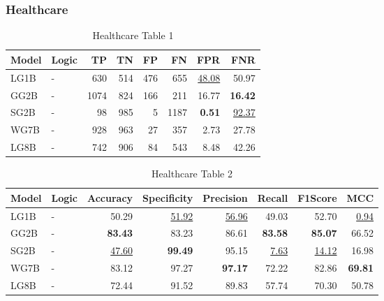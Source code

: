 \documentclass{article}
\begin{document}

\subsubsection{Healthcare}

\begin{table}[H]
\centering
\begin{tabular}{llrrrrrr}
\toprule
 Model          & Logic   &   TP &   TN &   FP &   FN &   FPR &   FNR \\
\midrule

 LG1B    & -       &  630 &  514 &  476 &  655 & \underline{48.08} & 50.97             \\
 GG2B    & -       & 1074 &  824 &  166 &  211 & 16.77             & \textbf{16.42}    \\
 SG2B    & -       &   98 &  985 &    5 & 1187 & \textbf{0.51}     & \underline{92.37} \\
 WG7B    & -       &  928 &  963 &   27 &  357 & 2.73              & 27.78             \\
 LG8B    & -       &  742 &  906 &   84 &  543 & 8.48              & 42.26             \\

\bottomrule
\end{tabular}
\caption{\label{tab:widgets}Healthcare Table 1}
\end{table}

\begin{table}[H]
\begin{tabular}{llrrrrrr}
\toprule
 Model          & Logic   &   Accuracy &   Specificity &   Precision &   Recall &   F1Score &      MCC \\
\midrule

 LG1B    & -       & 50.29             & \underline{51.92} & \underline{56.96} & 49.03            & 52.70             & \underline{0.94} \\
 GG2B    & -       & \textbf{83.43}    & 83.23             & 86.61             & \textbf{83.58}   & \textbf{85.07}    & 66.52            \\
 SG2B    & -       & \underline{47.60} & \textbf{99.49}    & 95.15             & \underline{7.63} & \underline{14.12} & 16.98            \\
 WG7B    & -       & 83.12             & 97.27             & \textbf{97.17}    & 72.22            & 82.86             & \textbf{69.81}   \\
 LG8B    & -       & 72.44             & 91.52             & 89.83             & 57.74            & 70.30             & 50.78            \\

\bottomrule
\end{tabular}
\caption{\label{tab:xstest2}Healthcare Table 2}
\end{table}
\end{document}
